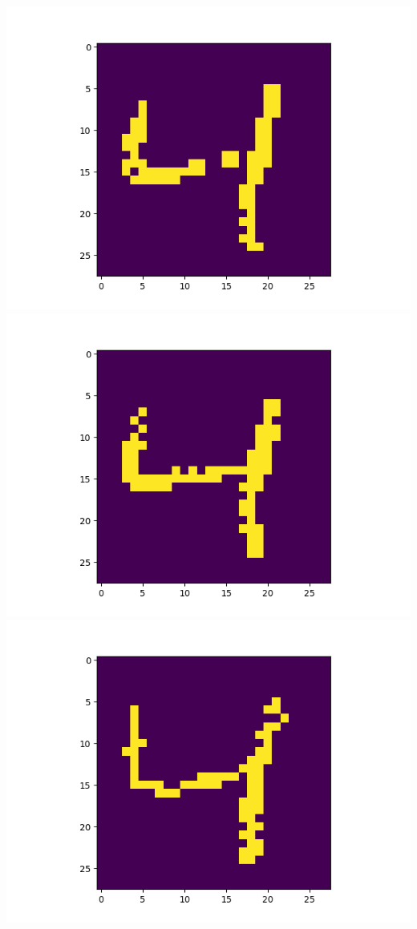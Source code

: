 \includegraphics[scale=0.2]{./bilder/comparison/prob/7}
\includegraphics[scale=0.2]{./bilder/comparison/prob/8}
\includegraphics[scale=0.2]{./bilder/comparison/prob/9}
